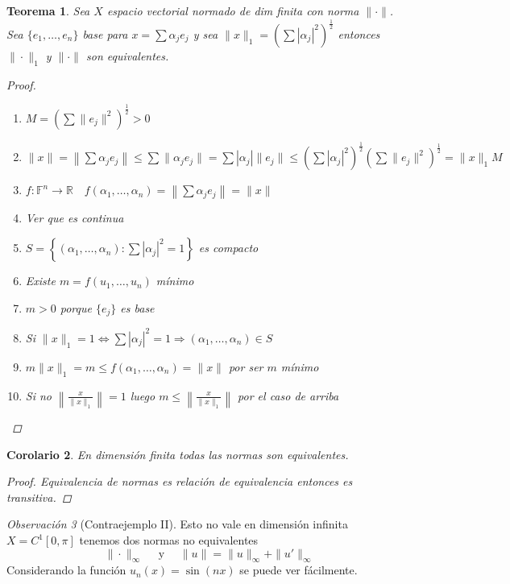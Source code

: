 \documentclass[12pt,a4paper]{article}
\newtheorem{theorem}{Teorema}[section]
\newtheorem{corollary}[theorem]{Corolario}
\theoremstyle{definition}
\theoremstyle{remark}
\newtheorem{remark}[theorem]{Observación}
\begin{document}
\begin{theorem}
Sea $X$ espacio vectorial normado de dim finita con norma $\|\cdot\|$. Sea $\{e_1,\ldots,e_n\}$ base para $x=\sum\alpha_j e_j$ y sea $\|x\|_1=\left(\sum|\alpha_j|^2\right)^{\frac{1}{2}}$ entonces $\|\cdot\|_1$ y $\|\cdot\|$ son equivalentes.
\begin{proof}
\begin{enumerate}
    \item $M=(\sum \|e_j\|^2)^{\frac{1}{2}}>0$
    \item $\|x\|=\left\|\sum\alpha_j e_j\right\|\leq \sum \|\alpha_j e_j\|=\sum|\alpha_j|\|e_j\| \leq (\sum|\alpha_j|^2)^{\frac{1}{2}}(\sum\|e_j\|^2)^{\frac{1}{2}} = \|x\|_1 M$
    \item $f:\mathbb{F}^n\rightarrow \mathbb{R}\quad f(\alpha_1,\ldots,\alpha_n)=\left\|\sum\alpha_j e_j\right\| =\|x\|$
    \item Ver que es continua
    \item $S=\left\{(\alpha_1,\dots,\alpha_n):\sum|\alpha_j|^2 = 1\right\}$ es compacto
    \item Existe $m = f(u_1,\dots,u_n)$ mínimo
    \item $m >0$ porque $\{e_j\}$ es base
    \item Si $\|x\|_1=1 \iff \sum|\alpha_j|^2=1 \Rightarrow(\alpha_1,\dots,\alpha_n)\in S$
    \item $m\|x\|_1 = m\leq f(\alpha_1,\dots,\alpha_n)=\|x\|$ por ser $m$ mínimo
    \item Si no $\left\|\frac{x}{\|x\|_1}\right\|=1$ luego $m \leq \left\|\frac{x}{\|x\|_1}\right\|$ por el caso de arriba
\end{enumerate}
\end{proof}
\end{theorem}

\begin{corollary}
En dimensión finita todas las normas son equivalentes.
\begin{proof}
Equivalencia de normas es relación de equivalencia entonces es transitiva.
\end{proof}
\end{corollary}

\begin{remark}[Contraejemplo II]
Esto no vale en dimensión infinita $X=C^1[0,\pi]$ tenemos dos normas no equivalentes 
$$\|\cdot\|_{\infty} \quad \text{ y }\quad \|u\| =\|u\|_{\infty}+\|u'\|_{\infty}$$
Considerando la función $u_n(x)=\sin(nx)$ se puede ver fácilmente.
\end{remark}
\end{document}

